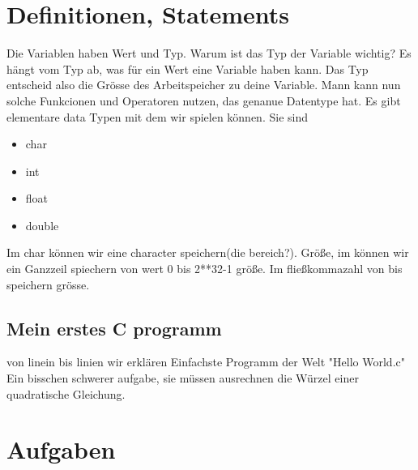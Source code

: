 \documentclass{article}[12pt]
\begin{document}
\section{Definitionen, Statements}
Die Variablen haben Wert und Typ. Warum ist das Typ der Variable wichtig? Es hängt vom Typ ab, was für ein Wert eine Variable haben
kann. Das Typ entscheid also die Grösse des Arbeitspeicher zu deine Variable. Mann kann nun solche Funkcionen und Operatoren nutzen, das 
genanue Datentype hat. Es gibt elementare data Typen mit dem wir spielen können. Sie sind
\begin{itemize}
\item char
\item int
\item float
\item double
\end{itemize}
Im char können wir eine character speichern(die bereich?). Größe, im können wir ein Ganzzeil spiechern von wert 0 bis 2**32-1 größe. 
Im fließkommazahl von bis speichern grösse.
\subsection{Mein erstes C programm}
von linein bis linien wir erklären Einfachste Programm der Welt "Hello World.c"
Ein bisschen schwerer aufgabe, sie müssen ausrechnen die Würzel einer quadratische Gleichung. 
\section{Aufgaben}
\end{document}
